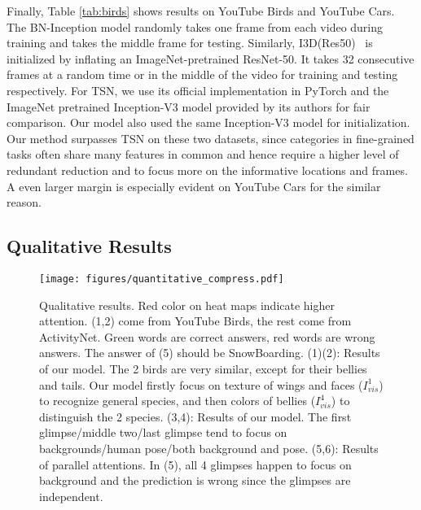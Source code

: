 \documentclass[runningheads]{llncs}
\begin{document}
Finally, Table \ref{tab:birds} shows results on YouTube Birds and YouTube Cars. The BN-Inception model randomly takes one frame from each video during training and takes the middle frame for testing. Similarly, I3D(Res50)~\cite{carreira2017quo} is initialized by inflating an ImageNet-pretrained ResNet-50. It takes 32 consecutive frames at a random time or in the middle of the video for training and testing respectively. For TSN, we use its official implementation in PyTorch and the ImageNet pretrained Inception-V3 model provided by its authors for fair comparison. Our model also used the same Inception-V3 model for initialization. Our method surpasses TSN on these two datasets, since categories in fine-grained tasks often share many features in common and hence require a higher level of redundant reduction and to focus more on the informative locations and frames. A even larger margin is especially evident on YouTube Cars for the similar reason. 

\subsection{Qualitative Results}
\begin{figure*}[htbp]
\centering
\texttt{[image: figures/quantitative\_compress.pdf]}
\caption{
\label{fig:quantitative}
Qualitative results. Red color on heat maps indicate higher attention. (1,2) come from YouTube Birds, the rest come from ActivityNet. Green words are correct answers, red words are wrong answers. The answer of (5) should be SnowBoarding. (1)(2): Results of our model. The 2 birds are very similar, except for their bellies and tails. Our model firstly focus on texture of wings and faces ($I_{vis}^{1}$) to recognize general species, and then colors of bellies ($I_{vis}^{4}$) to distinguish the 2 species. (3,4): Results of our model. The first glimpse/middle two/last glimpse tend to focus on backgrounds/human pose/both background and pose. (5,6): Results of parallel attentions. In (5), all 4 glimpses happen to focus on background and the prediction is wrong since the glimpses are independent.}
\end{figure*}
\end{document}
